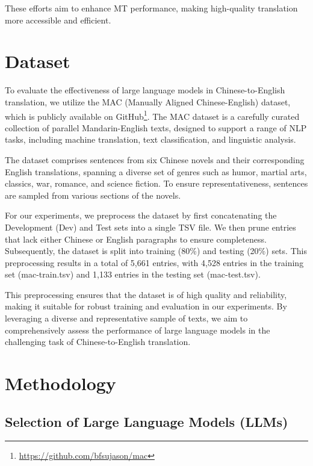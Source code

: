 \documentclass[conference]{IEEEtran}
\begin{document}
These efforts aim to enhance MT performance, making high-quality translation more accessible and efficient.

\section{Dataset}

To evaluate the effectiveness of large language models in Chinese-to-English translation, we utilize the MAC (Manually Aligned Chinese-English) dataset, which is publicly available on GitHub\footnote{\url{https://github.com/bfsujason/mac}}. The MAC dataset is a carefully curated collection of parallel Mandarin-English texts, designed to support a range of NLP tasks, including machine translation, text classification, and linguistic analysis.

The dataset comprises sentences from six Chinese novels and their corresponding English translations, spanning a diverse set of genres such as humor, martial arts, classics, war, romance, and science fiction. To ensure representativeness, sentences are sampled from various sections of the novels.

For our experiments, we preprocess the dataset by first concatenating the Development (Dev) and Test sets into a single TSV file. We then prune entries that lack either Chinese or English paragraphs to ensure completeness. Subsequently, the dataset is split into training (80\%) and testing (20\%) sets. This preprocessing results in a total of 5,661 entries, with 4,528 entries in the training set (mac-train.tsv) and 1,133 entries in the testing set (mac-test.tsv).

This preprocessing ensures that the dataset is of high quality and reliability, making it suitable for robust training and evaluation in our experiments. By leveraging a diverse and representative sample of texts, we aim to comprehensively assess the performance of large language models in the challenging task of Chinese-to-English translation.

\section{Methodology}

\subsection{Selection of Large Language Models (LLMs)}
\end{document}
